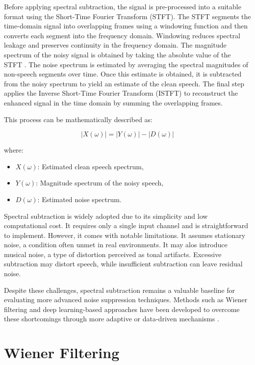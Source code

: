 Before applying spectral subtraction, the signal is pre-processed into a suitable format using the Short-Time Fourier Transform (STFT). The STFT segments the time-domain signal into overlapping frames using a windowing function and then converts each segment into the frequency domain. Windowing reduces spectral leakage and preserves continuity in the frequency domain. The magnitude spectrum of the noisy signal is obtained by taking the absolute value of the STFT \cite{dubey2016evaluation}. The noise spectrum is estimated by averaging the spectral magnitudes of non-speech segments over time. Once this estimate is obtained, it is subtracted from the noisy spectrum to yield an estimate of the clean speech. The final step applies the Inverse Short-Time Fourier Transform (ISTFT) to reconstruct the enhanced signal in the time domain by summing the overlapping frames.

This process can be mathematically described as:

\begin{equation}
    |X(\omega)| = |Y(\omega)| - |D(\omega)|
\end{equation}

where:
\begin{itemize}
    \item \( X(\omega) \): Estimated clean speech spectrum,
    \item \( Y(\omega) \): Magnitude spectrum of the noisy speech,
    \item \( D(\omega) \): Estimated noise spectrum.
\end{itemize}

Spectral subtraction is widely adopted due to its simplicity and low computational cost. It requires only a single input channel and is straightforward to implement. However, it comes with notable limitations. It assumes stationary noise, a condition often unmet in real environments. It may alos introduce musical noise, a type of distortion perceived as tonal artifacts. Excessive subtraction may distort speech, while insufficient subtraction can leave residual noise.

Despite these challenges, spectral subtraction remains a valuable baseline for evaluating more advanced noise suppression techniques. Methods such as Wiener filtering and deep learning-based approaches have been developed to overcome these shortcomings through more adaptive or data-driven mechanisms \cite{loizou2013speech}.


\section{Wiener Filtering}
\label{sec:wiener_filtering}

